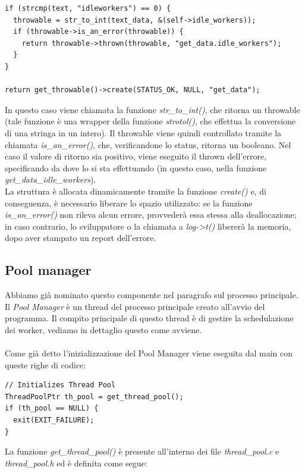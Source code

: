 \documentclass[italian]{tktltiki2}
\begin{document}
\begin{lstlisting}
if (strcmp(text, "idleworkers") == 0) {
  throwable = str_to_int(text_data, &(self->idle_workers));
  if (throwable->is_an_error(throwable)) {
    return throwable->thrown(throwable, "get_data.idle_workers");
  }
}

return get_throwable()->create(STATUS_OK, NULL, "get_data");
\end{lstlisting}
In questo caso viene chiamata la funzione \emph{str\_to\_int()}, che ritorna un throwable (tale funzione è una wrapper della funzione \emph{strotol()}, che effettua la conversione di una stringa in un intero). Il throwable viene quindi controllato tramite la chiamata \emph{is\_an\_error()}, che, verificandone lo status, ritorna un booleano. Nel caso il valore di ritorno sia positivo, viene eseguito il thrown dell'errore, specificando da dove lo si sta effettuando (in questo caso, nella funzione \emph{get\_data\_idle\_workers}).
\\
La struttura è allocata dinamicamente tramite la funzione \emph{create()} e, di conseguenza, è necessario liberare lo spazio utilizzato: se la funzione \emph{is\_an\_error()} non rileva alcun errore, provvederà essa stessa alla deallocazione; in caso contrario, lo sviluppatore o la chiamata a \emph{log->t()} libererà la memoria, dopo aver stampato un report dell'errore.

\subsection{Pool manager}
\label{ssec:pool}

Abbiamo già nominato questo componente nel paragrafo sul processo principale. Il \emph{Pool Manager} è un thread del processo principale creato all'avvio del programma. Il compito principale di questo thread è di gestire la schedulazione dei worker, vediamo in dettaglio questo come avviene.
\\
\\
Come già detto l'inizializzazione del Pool Manager viene eseguita dal main con queste righe di codice:
\begin{lstlisting}
// Initializes Thread Pool
ThreadPoolPtr th_pool = get_thread_pool();
if (th_pool == NULL) {
  exit(EXIT_FAILURE);
}
\end{lstlisting}
La funzione \emph{get\_thread\_pool()} è presente all'interno dei file \emph{thread\_pool.c} e \emph{thread\_pool.h} ed è definita come segue:
\end{document}
